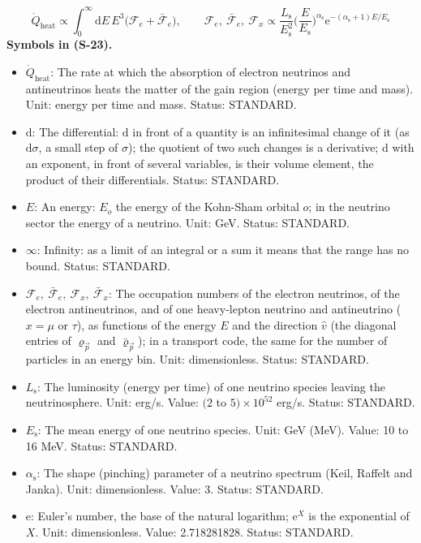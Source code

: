 \documentclass[
  10pt,
]{article}
\providecommand{\tightlist}{%
  \setlength{\itemsep}{0pt}\setlength{\parskip}{0pt}}
\begin{document}
\[
\dot Q_{\mathrm{heat}} \propto \int_0^\infty\mathrm{d}E\,E^3\big(\mathcal{F}_{e} + \bar{\mathcal{F}}_{e}\big),\qquad
\mathcal{F}_{e},\ \bar{\mathcal{F}}_{e},\ \mathcal{F}_{x} \propto \frac{L_{\mathrm{s}}}{E_{\mathrm{s}}^2}\Big(\frac{E}{E_{\mathrm{s}}}\Big)^{\alpha_{\mathrm{s}}}\mathrm{e}^{-(\alpha_{\mathrm{s}} + 1)E/E_{\mathrm{s}}} \tag{S-23}
\] \textbf{Symbols in (S-23).}

\begin{itemize}
\tightlist
\item
  \(\dot Q_{\mathrm{heat}}\): The rate at which the absorption of
  electron neutrinos and antineutrinos heats the matter of the gain
  region (energy per time and mass). Unit: energy per time and mass.
  Status: STANDARD.
\item
  \(\mathrm{d}\): The differential: \(\mathrm{d}\) in front of a
  quantity is an infinitesimal change of it (as \(\mathrm{d}\sigma\), a
  small step of \(\sigma\)); the quotient of two such changes is a
  derivative; \(\mathrm{d}\) with an exponent, in front of several
  variables, is their volume element, the product of their
  differentials. Status: STANDARD.
\item
  \(E\): An energy: \(E_o\) the energy of the Kohn-Sham orbital \(o\);
  in the neutrino sector the energy of a neutrino. Unit: GeV. Status:
  STANDARD.
\item
  \(\infty\): Infinity: as a limit of an integral or a sum it means that
  the range has no bound. Status: STANDARD.
\item
  \(\mathcal{F}_{e},\ \bar{\mathcal{F}}_{e},\ \mathcal{F}_{x},\ \bar{\mathcal{F}}_{x}\):
  The occupation numbers of the electron neutrinos, of the electron
  antineutrinos, and of one heavy-lepton neutrino and antineutrino
  (\(x = \mu\) or \(\tau\)), as functions of the energy \(E\) and the
  direction \(\hat v\) (the diagonal entries of \(\varrho_{\vec p}\) and
  \(\bar\varrho_{\vec p}\)); in a transport code, the same for the
  number of particles in an energy bin. Unit: dimensionless. Status:
  STANDARD.
\item
  \(L_{\mathrm{s}}\): The luminosity (energy per time) of one neutrino
  species leaving the neutrinosphere. Unit: erg/s. Value: \((2\) to
  \(5)\times10^{52}\) erg/s. Status: STANDARD.
\item
  \(E_{\mathrm{s}}\): The mean energy of one neutrino species. Unit: GeV
  (MeV). Value: 10 to 16 MeV. Status: STANDARD.
\item
  \(\alpha_{\mathrm{s}}\): The shape (pinching) parameter of a neutrino
  spectrum (Keil, Raffelt and Janka). Unit: dimensionless. Value: 3.
  Status: STANDARD.
\item
  \(\mathrm{e}\): Euler's number, the base of the natural logarithm;
  \(\mathrm{e}^{X}\) is the exponential of \(X\). Unit: dimensionless.
  Value: 2.718281828. Status: STANDARD.
\end{itemize}
\end{document}
